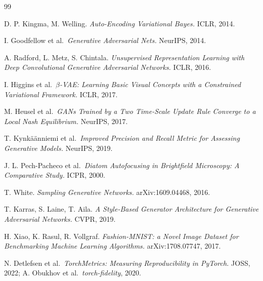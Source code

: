 \documentclass[11pt,letterpaper]{article}
\begin{document}
\begin{thebibliography}{99}

D. P. Kingma, M. Welling. \emph{Auto-Encoding Variational Bayes.} ICLR,
2014.

I. Goodfellow et al.~\emph{Generative Adversarial Nets.} NeurIPS, 2014.

A. Radford, L. Metz, S. Chintala. \emph{Unsupervised Representation
Learning with Deep Convolutional Generative Adversarial Networks.} ICLR,
2016.

I. Higgins et al.~\emph{\(\beta\)-VAE: Learning Basic Visual Concepts
with a Constrained Variational Framework.} ICLR, 2017.

M. Heusel et al.~\emph{GANs Trained by a Two Time-Scale Update Rule
Converge to a Local Nash Equilibrium.} NeurIPS, 2017.

T. Kynkäänniemi et al.~\emph{Improved Precision and Recall Metric for
Assessing Generative Models.} NeurIPS, 2019.

J. L. Pech-Pacheco et al.~\emph{Diatom Autofocusing in Brightfield
Microscopy: A Comparative Study.} ICPR, 2000.

T. White. \emph{Sampling Generative Networks.} arXiv:1609.04468, 2016.

T. Karras, S. Laine, T. Aila. \emph{A Style-Based Generator Architecture
for Generative Adversarial Networks.} CVPR, 2019.

H. Xiao, K. Rasul, R. Vollgraf. \emph{Fashion-MNIST: a Novel Image
Dataset for Benchmarking Machine Learning Algorithms.} arXiv:1708.07747,
2017.

N. Detlefsen et al.~\emph{TorchMetrics: Measuring Reproducibility in
PyTorch.} JOSS, 2022; A. Obukhov et al.~\emph{torch-fidelity}, 2020.

\end{thebibliography}
\end{document}

